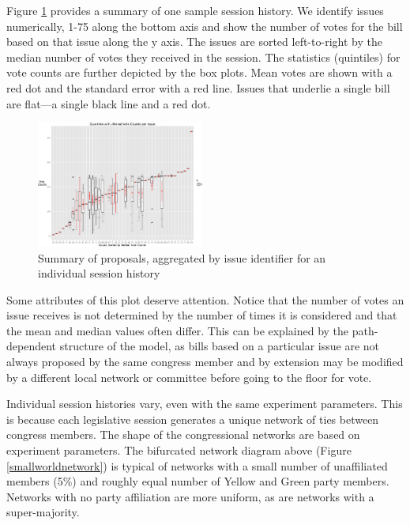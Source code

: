 \documentclass[pdftex,12pt]{llncs}
\begin{document}
Figure \ref{sessionhistory} provides a summary of one sample session history. 
We identify issues numerically, 1-75 along the bottom axis and show the number of votes for the bill based on that issue along the y axis. 
The issues are sorted left-to-right by the median number of votes they received in the session. 
The statistics (quintiles) for vote counts are further depicted by the box plots. 
Mean votes are shown with a red dot and the standard error with a red line. 
Issues that underlie a single bill are flat---a single black line and a red dot. 

\begin{figure}
  \includegraphics[width=0.49\textwidth]{votes_byIssue.eps}
 \caption[ ]{Summary of proposals, aggregated by issue identifier for an individual session history}
 \label{sessionhistory}
\end{figure}

Some attributes of this plot deserve attention. 
Notice that the number of votes an issue receives is not determined by the number of times it is considered and that the mean and median values often differ. 
This can be explained by the path-dependent structure of the model, as bills based on a particular issue are not always proposed by the same congress member and by extension may be modified by a different local network or committee before going to the floor for vote.

Individual session histories vary, even with the same experiment parameters. 
This is because each legislative session generates a unique network of ties between congress members. 
The shape of the congressional networks are based on experiment parameters. 
The bifurcated network diagram above (Figure \ref{smallworldnetwork}) is typical of networks with a small number of unaffiliated members (5\%) and roughly equal number of Yellow and Green party members. 
Networks with no party affiliation are more uniform, as are networks with a super-majority.  
\end{document}
